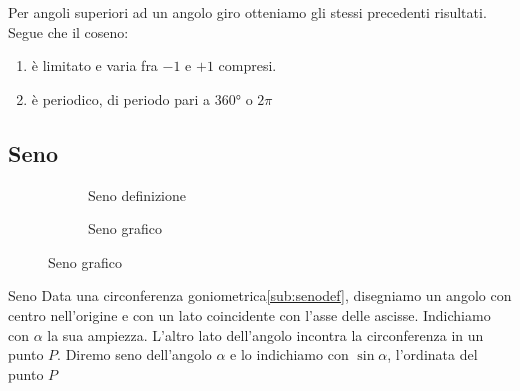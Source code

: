 Per angoli superiori ad un angolo giro otteniamo gli stessi precedenti risultati. 
Segue che il coseno:
\begin{enumerate}
	\item è limitato e varia fra $-1$ e $+1$ compresi.
	\item è periodico, di periodo pari a \ang{360} o $2\pi$
	\end{enumerate} 
\begin{figure}
		\centering

		\label{fig:AndamentoCoseno1}
	\end{figure}%
	\begin{figure}
		\centering

		\label{fig:AndamentoCoseno2}
\end{figure}
\subsection{Seno}
\label{sec:senogonio}
\begin{figure}
	\begin{subfigure}[b]{.5\linewidth}
		\centering
			
		\caption{Seno definizione}\label{sub:senodef}
	\end{subfigure}%
	\begin{subfigure}[b]{.5\linewidth}
		\centering
		
		\caption{Seno grafico}\label{sub:senograf}
	\end{subfigure}
	\label{tab:funseno}
\end{figure}
\begin{definizionet}{Seno}{}
	Data una circonferenza goniometrica\nobs\vref{sub:senodef}, disegniamo un angolo con centro nell'origine e con un lato coincidente con l'asse delle ascisse. Indichiamo con $\alpha$ la sua ampiezza. L'altro lato dell'angolo incontra la circonferenza in un punto $P$. Diremo seno dell'angolo $\alpha$ e lo indichiamo con $\sin\alpha$, l'ordinata del punto $P$
\end{definizionet}
\begin{figure}
	\centering
	
	\label{fig:AndamentoSeno1}
\end{figure}%
